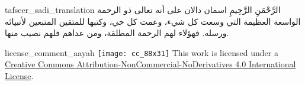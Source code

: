 \begin{taggedblock}{tafseer_sadi_translation}
{الرَّحْمَنِ الرَّحِيمِ}
اسمان دالان على أنه تعالى ذو الرحمة الواسعة العظيمة التي وسعت كل شيء، وعمت كل حي، وكتبها للمتقين المتبعين لأنبيائه ورسله. فهؤلاء لهم الرحمة المطلقة، ومن عداهم فلهم نصيب منها.
\end{taggedblock}
\begin{taggedblock}{license_comment_aayah}
\texttt{[image: cc\_88x31]}
This work is licensed under a 
\href{http://creativecommons.org/licenses/by-nc-nd/4.0/}{Creative Commons Attribution-NonCommercial-NoDerivatives 4.0 International License}.
\end{taggedblock}
\begin{comment}
Please use the following for footnotes:- Sample\footnoteQ{Text of Qur'an footnote goes here.}.
Sample\footnoteT{Text of Tafseer footnote goes here.}.
\end{comment}